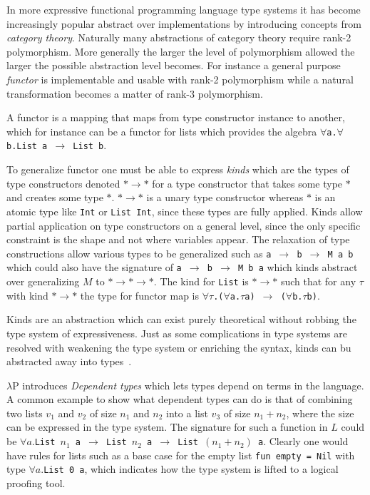 \documentclass[11pt,oneside,a4paper]{report}
\begin{document}
In more expressive functional programming language type systems it has become increasingly popular abstract over implementations by introducing concepts from \textit{category theory}.
Naturally many abstractions of category theory require rank-2 polymorphism.
More generally the larger the level of polymorphism allowed the larger the possible abstraction level becomes.
For instance a general purpose \textit{functor} is implementable and usable with rank-2 polymorphism while a natural transformation becomes a matter of rank-3 polymorphism.
\begin{remark}
    A functor is a mapping that maps from type constructor instance to another, which for instance can be a functor for lists which provides the algebra \texttt{$\forall$a.$\forall$b.List a $\rightarrow$ List b}.
\end{remark}
\noindent To generalize functor one must be able to express \textit{kinds} which are the types of type constructors denoted $* \rightarrow *$ for a type constructor that takes some type $*$ and creates some type $*$.
$* \rightarrow *$ is a unary type constructor whereas $*$ is an atomic type like \texttt{Int} or \texttt{List Int}, since these types are fully applied.
Kinds allow partial application on type constructors on a general level, since the only specific constraint is the shape and not where variables appear.
The relaxation of type constructions allow various types to be generalized such as \texttt{a $\rightarrow$ b $\rightarrow$ M a b} which could also have the signature of \texttt{a $\rightarrow$ b $\rightarrow$ M b a} which kinds abstract over generalizing $M$ to $* \rightarrow * \rightarrow *$.
The kind for \texttt{List} is $* \rightarrow *$ such that for any $\tau$ with kind $* \rightarrow *$ the type for functor map is \texttt{$\forall\tau$.($\forall$a.$\tau$a) $\rightarrow$ ($\forall$b.$\tau$b)}.
\begin{remark}
    Kinds are an abstraction which can exist purely theoretical without robbing the type system of expressiveness.
    Just as some complications in type systems are resolved with weakening the type system or enriching the syntax, kinds can bu abstracted away into types~\cite{weirich2013system}.
\end{remark}

$\lambda$P introduces \textit{Dependent types} which lets types depend on terms in the language.
A common example to show what dependent types can do is that of combining two lists $v_1$ and $v_2$ of size $n_1$ and $n_2$ into a list $v_3$ of size $n_1 + n_2$, where the size can be expressed in the type system.
The signature for such a function in $L$ could be \texttt{$\forall a.$List $n_1$ a $\rightarrow$ List $n_2$ a $\rightarrow$ List $(n_1 + n_2)$ a}.
Clearly one would have rules for lists such as a base case for the empty list \texttt{fun empty = Nil} with type \texttt{$\forall a.$List 0 a}, which indicates how the type system is lifted to a logical proofing tool.
\end{document}

